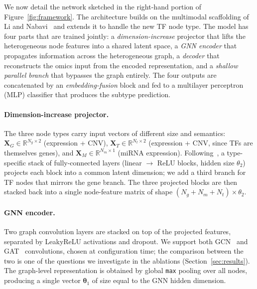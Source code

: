 \documentclass[review,3p,times,11pt, ]{elsarticle} %
\begin{document}
We now detail the network sketched in the right-hand portion of
Figure~\ref{fig:framework}. The architecture
builds on the multimodal scaffolding of Li and
Nabavi~\cite{li_multimodal_2024} and extends it to handle the new TF
node type. The model has four parts that are trained jointly: a
\emph{dimension-increase} projector that lifts the heterogeneous node
features into a shared latent space, a \emph{GNN encoder} that
propagates information across the heterogeneous graph, a
\emph{decoder} that reconstructs the omics input from the encoded
representation, and a \emph{shallow parallel branch} that bypasses the
graph entirely. The four outputs are concatenated by an
\emph{embedding-fusion} block and fed to a multilayer perceptron (MLP)
classifier that produces the subtype prediction.

\paragraph{Dimension-increase projector.}
The three node types carry input vectors of different size and
semantics: $\mathbf{X}_G \in \mathbb{R}^{N_g \times 2}$ (expression +
CNV), $\mathbf{X}_T \in \mathbb{R}^{N_t \times 2}$ (expression + CNV,
since TFs are themselves genes), and $\mathbf{X}_M \in \mathbb{R}^{N_m
\times 1}$ (miRNA expression). Following~\cite{li_multimodal_2024}, a
type-specific stack of fully-connected layers (linear $\rightarrow$
ReLU blocks, hidden size $\theta_2$) projects each block into a
common latent dimension; we add a third branch for TF nodes that
mirrors the gene branch. The three projected blocks are then stacked
back into a single node-feature matrix of shape
$(N_g + N_m + N_t) \times \theta_2$.

\paragraph{GNN encoder.}
Two graph convolution layers are stacked on top of the projected
features, separated by LeakyReLU activations and dropout. We support
both GCN~\cite{kipf_semi-supervised_2017} and
GAT~\cite{velickovic_graph_2018} convolutions, chosen at configuration
time; the comparison between the two is one of the questions we
investigate in the ablations (Section~\ref{sec:results}). The
graph-level representation is obtained by global \texttt{max} pooling
over all nodes, producing a single vector $\boldsymbol{\theta}_1$ of
size equal to the GNN hidden dimension.
\end{document}
